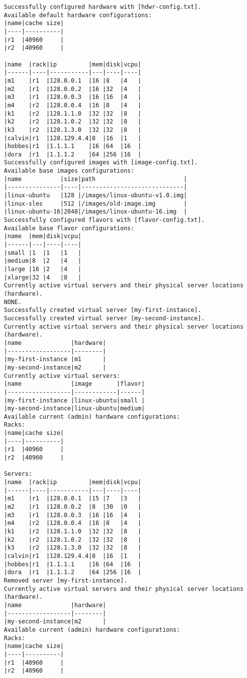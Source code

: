 \documentclass[11pt]{article}
\begin{document}
\begin{verbatim}
Successfully configured hardware with [hdwr-config.txt].
Available default hardware configurations:
|name|cache size|
|----|----------|
|r1  |40960     |
|r2  |40960     |

|name  |rack|ip         |mem|disk|vcpu|
|------|----|-----------|---|----|----|
|m1    |r1  |128.0.0.1  |16 |8   |4   |
|m2    |r1  |128.0.0.2  |16 |32  |4   |
|m3    |r1  |128.0.0.3  |16 |16  |4   |
|m4    |r2  |128.0.0.4  |16 |8   |4   |
|k1    |r2  |128.1.1.0  |32 |32  |8   |
|k2    |r2  |128.1.0.2  |32 |32  |8   |
|k3    |r2  |128.1.3.0  |32 |32  |8   |
|calvin|r1  |128.129.4.4|8  |16  |1   |
|hobbes|r1  |1.1.1.1    |16 |64  |16  |
|dora  |r1  |1.1.1.2    |64 |256 |16  |
Successfully configured images with [image-config.txt].
Available base images configurations:
|name           |size|path                         |
|---------------|----|-----------------------------|
|linux-ubuntu   |128 |/images/linux-ubuntu-v1.0.img|
|linux-sles     |512 |/images/old-image.img        |
|linux-ubuntu-16|2048|/images/linux-ubuntu-16.img  |
Successfully configured flavors with [flavor-config.txt].
Available base flavor configurations:
|name  |mem|disk|vcpu|
|------|---|----|----|
|small |1  |1   |1   |
|medium|8  |2   |4   |
|large |16 |2   |4   |
|xlarge|32 |4   |8   |
Currently active virtual servers and their physical server locations (hardware).
NONE.
Successfully created virtual server [my-first-instance].
Successfully created virtual server [my-second-instance].
Currently active virtual servers and their physical server locations (hardware).
|name              |hardware|
|------------------|--------|
|my-first-instance |m1      |
|my-second-instance|m2      |
Currently active virtual servers:
|name              |image       |flavor|
|------------------|------------|------|
|my-first-instance |linux-ubuntu|small |
|my-second-instance|linux-ubuntu|medium|
Available current (admin) hardware configurations:
Racks:
|name|cache size|
|----|----------|
|r1  |40960     |
|r2  |40960     |

Servers:
|name  |rack|ip         |mem|disk|vcpu|
|------|----|-----------|---|----|----|
|m1    |r1  |128.0.0.1  |15 |7   |3   |
|m2    |r1  |128.0.0.2  |8  |30  |0   |
|m3    |r1  |128.0.0.3  |16 |16  |4   |
|m4    |r2  |128.0.0.4  |16 |8   |4   |
|k1    |r2  |128.1.1.0  |32 |32  |8   |
|k2    |r2  |128.1.0.2  |32 |32  |8   |
|k3    |r2  |128.1.3.0  |32 |32  |8   |
|calvin|r1  |128.129.4.4|8  |16  |1   |
|hobbes|r1  |1.1.1.1    |16 |64  |16  |
|dora  |r1  |1.1.1.2    |64 |256 |16  |
Removed server [my-first-instance].
Currently active virtual servers and their physical server locations (hardware).
|name              |hardware|
|------------------|--------|
|my-second-instance|m2      |
Available current (admin) hardware configurations:
Racks:
|name|cache size|
|----|----------|
|r1  |40960     |
|r2  |40960     |


\end{verbatim}
\end{document}
